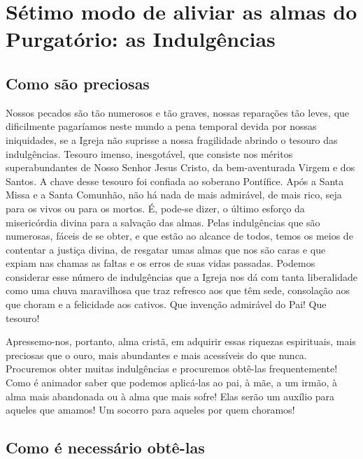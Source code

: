 \renewcommand{\thechapterdisplay}{Vigésimo sexto dia}
\renewcommand{\thechapterrunner}{Sétimo modo de aliviar as almas do Purgatório: as Indulgências}
\chapter[Vigésimo sexto dia --- Sétimo modo de aliviar as almas do Purgatório: as Indulgências ]{Sétimo modo de aliviar as almas do Purgatório: as Indulgências}
\section*{Como são preciosas}

Nossos pecados são tão numerosos e tão graves, nossas reparações tão leves, que dificilmente pagaríamos neste mundo a pena temporal devida por nossas iniquidades, se a Igreja não suprisse a nossa fragilidade abrindo o tesouro das indulgências. Tesouro imenso, inesgotável, que consiste nos méritos superabundantes de Nosso Senhor Jesus Cristo, da bem-aventurada Virgem e dos Santos. A chave desse tesouro foi confiada ao soberano Pontífice. Após a Santa Missa e a Santa Comunhão, não há nada de mais admirável, de mais rico, seja para os vivos ou para os mortos. É, pode-se dizer, o último esforço da misericórdia divina para a salvação das almas. Pelas indulgências que são numerosas, fáceis de se obter, e que estão ao alcance de todos, temos os meios de contentar a justiça divina, de resgatar umas almas que nos são caras e que expiam nas chamas as faltas e os erros de suas vidas passadas. Podemos considerar esse número de indulgências que a Igreja nos dá com tanta liberalidade como uma chuva maravilhosa que traz refresco aos que têm sede, consolação aos que choram e a felicidade aos cativos. Que invenção admirável do Pai! Que tesouro!

Apressemo-nos, portanto, alma cristã, em adquirir essas riquezas espirituais, mais preciosas que o ouro, mais abundantes e mais acessíveis do que nunca. Procuremos obter muitas indulgências e procuremos obtê-las frequentemente! Como é animador saber que podemos aplicá-las ao pai, à mãe, a um irmão, à alma mais abandonada ou à alma que mais sofre! Elas serão um auxílio para aqueles que amamos! Um socorro para aqueles por quem choramos! 


\section*{Como é necessário obtê-las}

